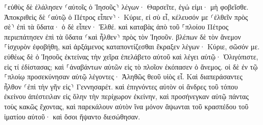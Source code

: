 \documentclass[twoside, 9pt]{extreport}
\begin{document}
⸀εὐθὺς δὲ ἐλάλησεν ⸂αὐτοῖς ὁ Ἰησοῦς⸃ λέγων· Θαρσεῖτε, ἐγώ εἰμι· μὴ φοβεῖσθε. 
Ἀποκριθεὶς δὲ ⸂αὐτῷ ὁ Πέτρος εἶπεν⸃· Κύριε, εἰ σὺ εἶ, κέλευσόν με ⸂ἐλθεῖν πρὸς σὲ⸃ ἐπὶ τὰ ὕδατα· 
ὁ δὲ εἶπεν· Ἐλθέ. καὶ καταβὰς ἀπὸ τοῦ ⸀πλοίου Πέτρος περιεπάτησεν ἐπὶ τὰ ὕδατα ⸂καὶ ἦλθεν⸃ πρὸς τὸν Ἰησοῦν. 
βλέπων δὲ τὸν ἄνεμον ⸀ἰσχυρὸν ἐφοβήθη, καὶ ἀρξάμενος καταποντίζεσθαι ἔκραξεν λέγων· Κύριε, σῶσόν με. 
εὐθέως δὲ ὁ Ἰησοῦς ἐκτείνας τὴν χεῖρα ἐπελάβετο αὐτοῦ καὶ λέγει αὐτῷ· Ὀλιγόπιστε, εἰς τί ἐδίστασας; 
καὶ ⸀ἀναβάντων αὐτῶν εἰς τὸ πλοῖον ἐκόπασεν ὁ ἄνεμος. 
οἱ δὲ ἐν τῷ ⸀πλοίῳ προσεκύνησαν αὐτῷ λέγοντες· Ἀληθῶς θεοῦ υἱὸς εἶ. 
Καὶ διαπεράσαντες ἦλθον ⸂ἐπὶ τὴν γῆν εἰς⸃ Γεννησαρέτ. 
καὶ ἐπιγνόντες αὐτὸν οἱ ἄνδρες τοῦ τόπου ἐκείνου ἀπέστειλαν εἰς ὅλην τὴν περίχωρον ἐκείνην, καὶ προσήνεγκαν αὐτῷ πάντας τοὺς κακῶς ἔχοντας, 
καὶ παρεκάλουν αὐτὸν ἵνα μόνον ἅψωνται τοῦ κρασπέδου τοῦ ἱματίου αὐτοῦ· καὶ ὅσοι ἥψαντο διεσώθησαν. 
\end{document}
